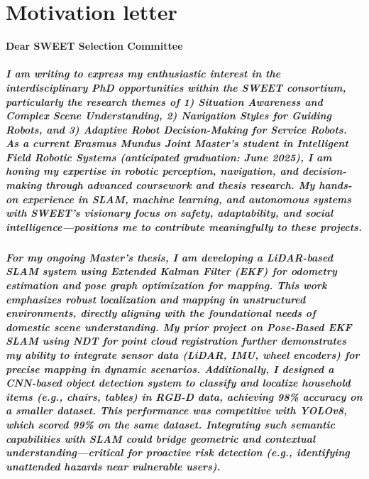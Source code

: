 \chapter{Motivation letter}
\label{ch:letter}
\textbf{Dear SWEET Selection Committee}

\paragraph{\noindent
\textnormal{
I am writing to express my enthusiastic interest in the interdisciplinary PhD opportunities within the SWEET consortium, particularly the research themes of 1) Situation Awareness and Complex Scene Understanding, 2) Navigation Styles for Guiding Robots, and 3) Adaptive Robot Decision-Making for Service Robots. As a current Erasmus Mundus Joint Master’s student in Intelligent Field Robotic Systems (anticipated graduation: June 2025), I am honing my expertise in robotic perception, navigation, and decision-making through advanced coursework and thesis research. My hands-on experience in SLAM, machine learning, and autonomous systems with SWEET’s visionary focus on safety, adaptability, and social intelligence—positions me to contribute meaningfully to these projects.}}

\paragraph{\noindent
\textnormal{
For my ongoing Master’s thesis, I am developing a LiDAR-based SLAM system using Extended Kalman Filter (EKF) for odometry estimation and pose graph optimization for mapping. This work emphasizes robust localization and mapping in unstructured environments, directly aligning with the foundational needs of domestic scene understanding. My prior project on Pose-Based EKF SLAM using NDT for point cloud registration further demonstrates my ability to integrate sensor data (LiDAR, IMU, wheel encoders) for precise mapping in dynamic scenarios. Additionally, I designed a CNN-based object detection system to classify and localize household items (e.g., chairs, tables) in RGB-D data, achieving 98\% accuracy on a smaller dataset. This performance was competitive with YOLOv8, which scored 99\% on the same dataset. Integrating such semantic capabilities with SLAM could bridge geometric and contextual understanding—critical for proactive risk detection (e.g., identifying unattended hazards near vulnerable users).}}

